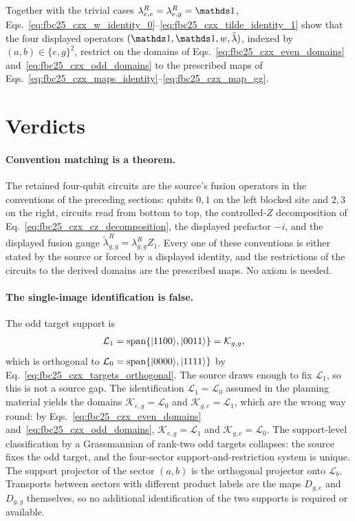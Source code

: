\documentclass{article}
\begin{document}
Together with the trivial cases $\lambda^R_{e,e}=\lambda^R_{e,g}=\Id$,
Eqs.~\ref{eq:fbc25_czx_w_identity_0}--\ref{eq:fbc25_czx_tilde_identity_1}
show that the four displayed operators $(\Id,\Id,w,\tilde\lambda)$, indexed
by $(a,b)\in\{e,g\}^2$, restrict on the domains of
Eqs.~\ref{eq:fbc25_czx_even_domains} and~\ref{eq:fbc25_czx_odd_domains} to
the prescribed maps of
Eqs.~\ref{eq:fbc25_czx_maps_identity}--\ref{eq:fbc25_czx_map_gg}.

\section{Verdicts}

\paragraph{Convention matching is a theorem.}
The retained four-qubit circuits are the source's fusion operators in the
conventions of the preceding sections: qubits $0,1$ on the left blocked
site and $2,3$ on the right, circuits read from bottom to top, the
controlled-$Z$ decomposition of Eq.~\ref{eq:fbc25_czx_cz_decomposition},
the displayed prefactor $-i$, and the displayed fusion gauge
$\tilde\lambda^R_{g,g}=\lambda^R_{g,g}Z_1$. Every one of these conventions
is either stated by the source or forced by a displayed identity, and the
restrictions of the circuits to the derived domains are the prescribed maps.
No axiom is needed.

\paragraph{The single-image identification is false.}
The odd target support is
\begin{align}
    \mathcal L_1
        &=\operatorname{span}\{|1100\rangle,|0011\rangle\}
        =\mathcal K_{g,g},
    \label{eq:fbc25_czx_L1}
\end{align}
which is orthogonal to $\mathcal L_0=\operatorname{span}\{|0000\rangle,|1111\rangle\}$
by Eq.~\ref{eq:fbc25_czx_targets_orthogonal}. The source draws enough to
fix $\mathcal L_1$, so this is not a source gap. The identification
$\mathcal L_1=\mathcal L_0$ assumed in the planning material yields the
domains $\mathcal K_{e,g}=\mathcal L_0$ and $\mathcal K_{g,e}=\mathcal L_1$,
which are the wrong way round: by
Eqs.~\ref{eq:fbc25_czx_even_domains} and~\ref{eq:fbc25_czx_odd_domains},
$\mathcal K_{e,g}=\mathcal L_1$ and $\mathcal K_{g,e}=\mathcal L_0$. The
support-level classification by a Grassmannian of rank-two odd targets
collapses: the source fixes the odd target, and the four-sector
support-and-restriction system is unique. The support projector of the
sector $(a,b)$ is the orthogonal projector onto $\mathcal L_b$. Transports
between sectors with different product labels are the maps $D_{g,e}$ and
$D_{g,g}$ themselves, so no additional identification of the two supports is
required or available.
\end{document}
